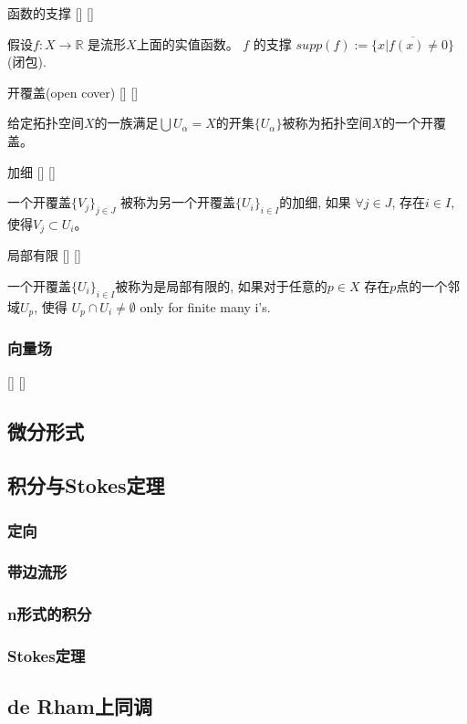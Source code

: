 \documentclass[UTF8]{ctexart}
\begin{document}
    \begin{dfn}
        []
        {函数的支撑}
        []
        []

        假设$f : X \rightarrow \mathbb{R}$ 是流形$X$上面的实值函数。
        $f$ 的支撑 $supp(f) := \overline{\{ x | f(x) \neq 0 \}}$(闭包).
    \end{dfn}

    \begin{dfn}
        []
        {开覆盖(open cover)}
        []
        []

        给定拓扑空间$X$的一族满足$\bigcup U_{\alpha} = X$的开集$\{U_{\alpha} \}$被称为拓扑空间$X$的一个开覆盖。
    \end{dfn}

    \begin{dfn}
        []
        {加细}
        []
        []

        一个开覆盖$\{V_j\}_{j \in J}$ 被称为另一个开覆盖$\{U_i\}_{i \in I}$的加细, 如果 $\forall j \in J$, 存在$i \in I$,使得$V_j \subset U_i$。
    \end{dfn}

    \begin{dfn}
        []
        {局部有限}
        []
        []

        一个开覆盖$\{U_i \}_{i \in I}$被称为是局部有限的, 如果对于任意的$p \in X$
        存在$p$点的一个邻域$U_p$, 使得 $U_p \cap U_i \neq \emptyset$ only for finite many i's.
    \end{dfn}
    \subsubsection{向量场}
    
    \begin{dfn}
        []
        {}
        []
        []
        
    \end{dfn}
    
    \subsection{微分形式}

    \subsection{积分与Stokes定理}

    \subsubsection{定向}

    \subsubsection{带边流形}

    \subsubsection{n形式的积分}

    \subsubsection{Stokes定理}
    
    \subsection{de Rham上同调}

    
\end{document}
